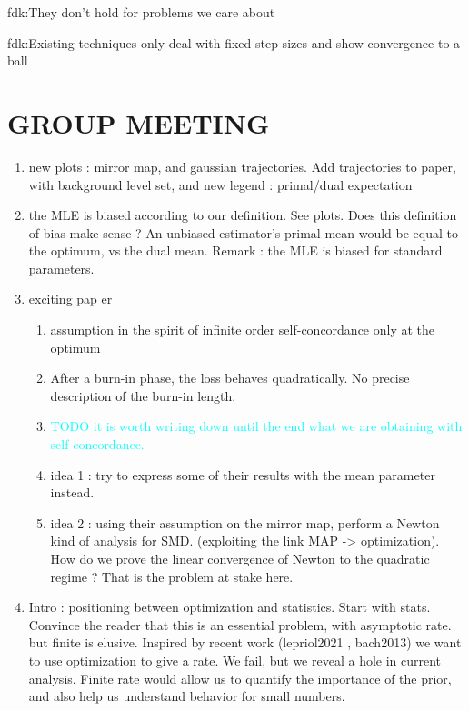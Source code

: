 \documentclass[twoside]{article}
\let\oldsection\section
\renewcommand{\section}[1]{\oldsection{\texorpdfstring{\uppercase{#1}}{#1}}}
\newcommand{\fdk}[1]{\textcolor{Periwinkle}{fdk:#1}}
\newcommand{\TODO}[1]{\textcolor{cyan}{TODO #1}}
\begin{document}
\fdk{They don't hold for problems we care about}

\fdk{Existing techniques only deal with fixed step-sizes and show convergence to a ball}








\newpage




\clearpage
\section{Group Meeting}
\begin{enumerate}
	\item new plots : mirror map, and gaussian trajectories. Add trajectories to paper, with background level set, and new legend : primal/dual expectation
	\item the MLE is biased according to our definition. See plots. Does this definition of bias make sense ? An unbiased estimator's primal mean would be equal to the optimum, vs the dual mean.  Remark : the MLE is biased for standard parameters.
	\item exciting pap er\citet{kakade2010learning}
	\begin{enumerate}
		\item assumption in the spirit of infinite order self-concordance only at the optimum
		\item After a burn-in phase, the loss behaves quadratically. No precise description of the burn-in length.
		\item \TODO{it is worth writing down until the end what we are obtaining with self-concordance.}
		\item idea 1 : try to express some of their results with the mean parameter instead.
		\item idea 2 : using their assumption on the mirror map, perform a Newton kind of analysis for SMD. (exploiting the link MAP -> optimization). How do we prove the linear convergence of Newton to the quadratic regime ? That is the problem at stake here.
	\end{enumerate}
	\item Intro : positioning between optimization and statistics. Start with stats. Convince the reader that this is an essential problem, with asymptotic rate. but finite is elusive. Inspired by recent work (lepriol2021 , bach2013) we want to use optimization to give a rate. We fail, but we reveal a hole in current analysis.  Finite rate would allow us to quantify the importance of the prior, and also help us understand behavior for small numbers.

\end{enumerate}
\end{document}
